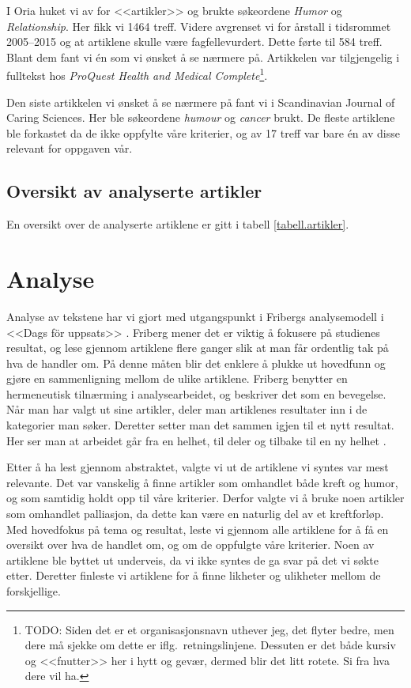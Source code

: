 I Oria huket vi av for <<artikler>> og brukte søkeordene \textit{Humor} og
\textit{Relationship}. Her fikk vi 1464 treff. Videre avgrenset vi for årstall
i tidsrommet 2005--2015 og at artiklene skulle være fagfellevurdert. Dette
førte til 584 treff. Blant dem fant vi én som vi ønsket å se nærmere på.
Artikkelen var tilgjengelig i fulltekst hos \textit{ProQuest Health and Medical
Complete}\footnote{TODO: Siden det er et organisasjonsnavn uthever jeg, det
flyter bedre, men dere må sjekke om dette er iflg.~retningslinjene. Dessuten er
det både kursiv og <<fnutter>> her i hytt og gevær, dermed blir det litt
rotete. Si fra hva dere vil ha.}.

Den siste artikkelen vi ønsket å se nærmere på fant vi i Scandinavian Journal
of Caring Sciences. Her ble søkeordene \textit{humour} og \textit{cancer}
brukt. De fleste artiklene ble forkastet da de ikke oppfylte våre kriterier, og
av 17 treff var bare én av disse relevant for oppgaven vår.

\subsection{Oversikt av analyserte artikler}

En oversikt over de analyserte artiklene er gitt i tabell
\vref{tabell.artikler}.



\section{Analyse}

Analyse av tekstene har vi gjort med utgangspunkt i Fribergs analysemodell i
<<Dags för uppsats>> \citeyear{friberg2006}. Friberg mener det er viktig å
fokusere på studienes resultat, og lese gjennom artiklene flere ganger slik at
man får ordentlig tak på hva de handler om. På denne måten blir det enklere å
plukke ut hovedfunn og gjøre en sammenligning mellom de ulike artiklene.
Friberg benytter en hermeneutisk tilnærming i analysearbeidet, og beskriver det
som en bevegelse. Når man har valgt ut sine artikler, deler man artiklenes
resultater inn i de kategorier man søker. Deretter setter man det sammen igjen
til et nytt resultat. Her ser man at arbeidet går fra en helhet, til deler og
tilbake til en ny helhet \cite[s.~110]{friberg2006}.

Etter å ha lest gjennom abstraktet, valgte vi ut de artiklene vi syntes var
mest relevante. Det var vanskelig å finne artikler som omhandlet både kreft og
humor, og som samtidig holdt opp til våre kriterier. Derfor valgte vi å bruke
noen artikler som omhandlet palliasjon, da dette kan være en naturlig del av et
kreftforløp. Med hovedfokus på tema og resultat, leste vi gjennom alle
artiklene for å få en oversikt over hva de handlet om, og om de oppfulgte våre
kriterier. Noen av artiklene ble byttet ut underveis, da vi ikke syntes de ga
svar på det vi søkte etter. Deretter finleste vi artiklene for å finne likheter
og ulikheter mellom de forskjellige.

